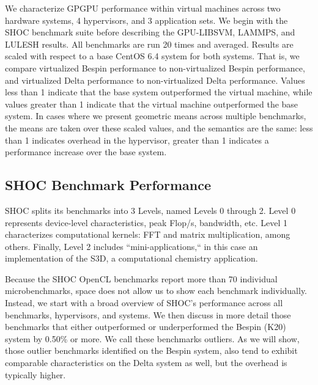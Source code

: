 We characterize GPGPU performance within virtual machines across two hardware
systems, 4 hypervisors, and 3 application sets.  We begin with the SHOC
benchmark suite before describing the GPU-LIBSVM, LAMMPS, and LULESH results.
All benchmarks are run 20 times and averaged.  Results are scaled with respect
to a base CentOS 6.4 system for both systems.  That is, we compare virtualized
Bespin performance to non-virtualized Bespin performance, and virtualized Delta
performance to non-virtualized Delta performance.  Values less than 1 indicate that the base system
outperformed the virtual machine, while values greater than 1 indicate that the
virtual machine outperformed the base system.  In cases where we present
geometric means across multiple benchmarks, the means are taken over these scaled values, and the semantics
are the same: less than 1 indicates overhead in the hypervisor, greater than 1
indicates a performance increase over the base system.


\subsection{SHOC Benchmark Performance}



SHOC splits its benchmarks into 3 Levels, named Levels 0 through 2.  Level 0
represents device-level characteristics, peak Flop/s, bandwidth, etc.  Level 1
characterizes computational kernels: FFT and matrix multiplication, among others.
Finally, Level 2 includes ``mini-applications,`` in this case an implementation
of the S3D, a computational chemistry application.  

Because the SHOC OpenCL benchmarks report more than 70 individual
microbenchmarks, space does not allow us to show each benchmark individually.
Instead, we start with a broad overview of SHOC's performance across all
benchmarks, hypervisors, and systems.  We then discuss in more detail those
benchmarks that either outperformed or underperformed the Bespin (K20) system by
0.50\% or more. We call these benchmarks outliers. As we will show, those
outlier benchmarks identified on the Bespin system, also tend to exhibit
comparable characteristics on the Delta system as well, but the overhead is
typically higher.

